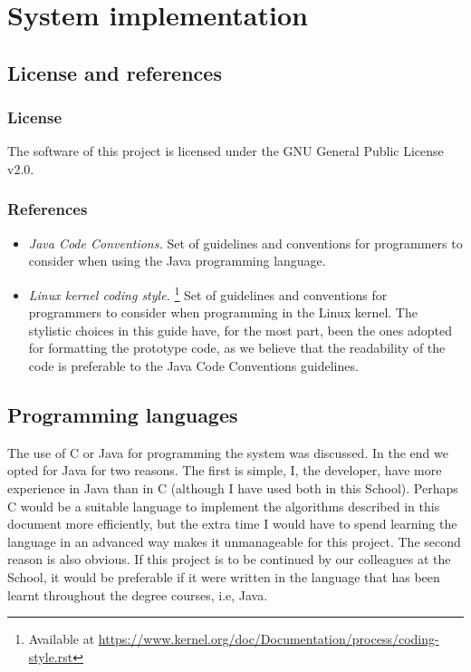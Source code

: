 \renewcommand{\documentname}{System implementation}

\chapter{System implementation}


\section{License and references}

\subsection{License}

The software of this project is licensed under the GNU General Public License v2.0.

\subsection{References}

\begin{itemize}
    \item \textit{Java Code Conventions.} Set of guidelines and conventions for programmers to consider when using the Java programming language.

    \item \textit{Linux kernel coding style.} \footnote{Available at \url{https://www.kernel.org/doc/Documentation/process/coding-style.rst}} Set of guidelines and conventions for programmers to consider when programming in the Linux kernel. The stylistic choices in this guide have, for the most part, been the ones adopted for formatting the prototype code, as we believe that the readability of the code is preferable to the Java Code Conventions guidelines.
\end{itemize}



\section{Programming languages}

The use of C or Java for programming the system was discussed. In the end we opted for Java for two reasons. The first is simple, I, the developer, have more experience in Java than in C (although I have used both in this School). Perhaps C would be a suitable language to implement the algorithms described in this document more efficiently, but the extra time I would have to spend learning the language in an advanced way makes it unmanageable for this project. The second reason is also obvious. If this project is to be continued by our colleagues at the School, it would be preferable if it were written in the language that has been learnt throughout the degree courses, i.e, Java.

